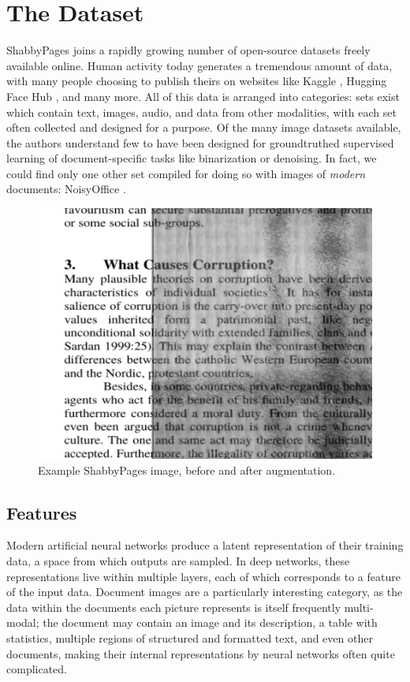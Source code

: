 \documentclass[runningheads]{llncs}
\begin{document}
\section{The Dataset}
ShabbyPages joins a rapidly growing number of open-source datasets freely available online.
Human activity today generates a tremendous amount of data, with many people choosing to publish theirs on websites like Kaggle \cite{ref_Kaggle}, Hugging Face Hub \cite{ref_HuggingFaceHub}, and many more.
All of this data is arranged into categories: sets exist which contain text, images, audio, and data from other modalities, with each set often collected and designed for a purpose.
Of the many image datasets available, the authors understand few to have been designed for groundtruthed supervised learning of document-specific tasks like binarization or denoising.
In fact, we could find only one other set compiled for doing so with images of \textit{modern} documents: NoisyOffice \cite{ref_NoisyOffice}.

\begin{figure}
\includegraphics[width=\textwidth]{Article_Hero_Picture_Shadow.png}
\caption{Example ShabbyPages image, before and after augmentation.} \label{fig1}
\end{figure}

\subsection{Features}
Modern artificial neural networks produce a latent representation of their training data, a space from which outputs are sampled.
In deep networks, these representations live within multiple layers, each of which corresponds to a feature of the input data.
Document images are a particularly interesting category, as the data within the documents each picture represents is itself frequently multi-modal; the document may contain an image and its description, a table with statistics, multiple regions of structured and formatted text, and even other documents, making their internal representations by neural networks often quite complicated.
\end{document}
